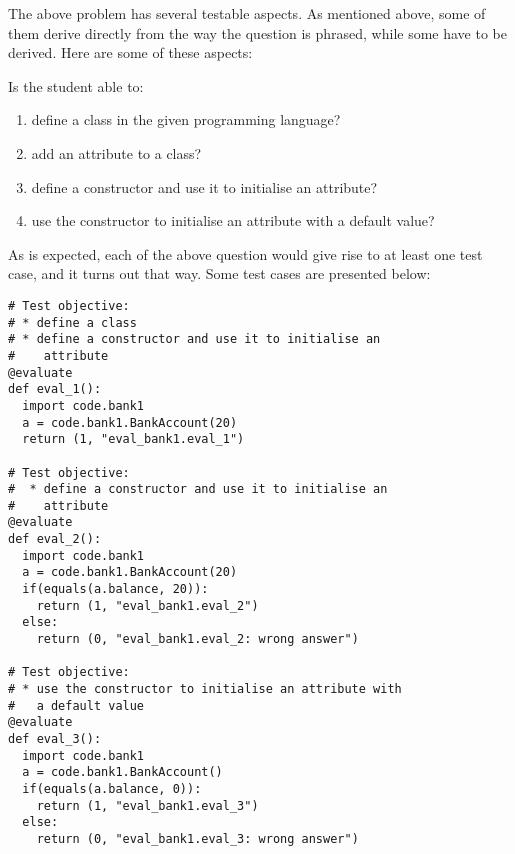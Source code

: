 \documentclass[12pt]{article}
\begin{document}
The above problem has several testable aspects. As mentioned above, some of them derive directly from the way the question is phrased, while some have to be derived. Here are some of these aspects:

Is the student able to:
\begin{enumerate}
\item define a class in the given programming language?
\item add an attribute to a class?
\item define a constructor and use it to initialise an attribute?
\item use the constructor to initialise an attribute with a default value?
\end{enumerate}

As is expected, each of the above question would give rise to at least one test case, and it turns out that way. Some test cases are presented below:
\begin{lstlisting}[style=pc]
# Test objective:
# * define a class 
# * define a constructor and use it to initialise an 
#    attribute
@evaluate
def eval_1():
  import code.bank1
  a = code.bank1.BankAccount(20)
  return (1, "eval_bank1.eval_1")

# Test objective:
#  * define a constructor and use it to initialise an
#    attribute
@evaluate
def eval_2():
  import code.bank1
  a = code.bank1.BankAccount(20)
  if(equals(a.balance, 20)):
    return (1, "eval_bank1.eval_2")
  else:
    return (0, "eval_bank1.eval_2: wrong answer")

# Test objective: 
# * use the constructor to initialise an attribute with
#   a default value
@evaluate
def eval_3():
  import code.bank1
  a = code.bank1.BankAccount()
  if(equals(a.balance, 0)):
    return (1, "eval_bank1.eval_3")
  else:
    return (0, "eval_bank1.eval_3: wrong answer")
\end{lstlisting}
\end{document}
